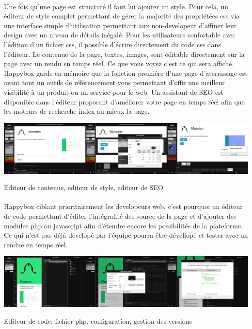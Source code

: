 \documentclass[11pt, a4paper ]{article}
\begin{document}
\paragraph{} %
Une fois qu'une page est structuré il faut lui ajouter un style. Pour cela, un éditeur de style complet permettant de gérer la majorité des propriétées css via une interface simple d'utilisation permettant aux non-developeur d'affiner leur design avec un niveau de détails inégalé. Pour les utilisateurs confortable avec l'édition d'un fichier css, il possible d'écrire directement du code css dans l'éditeur.
Le contenue de la page, textes, images, sont éditable directement sur la page avec un rendu en temps réel. Ce que vous voyez c'est ce qui sera affiché.
Happybox garde en mémoire que la fonction premiére d'une page d'aterrissage est avant tout un outils de référencement vous permettant d'offir une meilleur visibilité à un produit ou un service pour le web. Un assistant de SEO est disponible dans l'éditeur proposant d'améliorer votre page en temps réel afin que les moteurs de recherche index au mieux la page.
\begin{center}
	\includegraphics[width=\textwidth]{images/HBscreen/contenueStyleSeo.png}
	\caption{Editeur de contenue, editeur de style, editeur de SEO}
\end{center}

\paragraph{} %
Happybox ciblant prioritairement les developeurs web, c'est pourquoi un éditeur de code permettant d'éditer l'intégralité des source de la page et d'ajouter des modules php ou javascript afin d'étendre encore les possibilités de la plateforme. Ce qui n'est pas déjà dévelopé par l'équipe pourra être dévellopé et tester avec un rendue en temps réel.
\begin{center}
	\includegraphics[width=\textwidth]{images/HBscreen/codeManager.png}
	\caption{Editeur de code: fichier php, configuration, gestion des versions}
\end{center}
\end{document}

